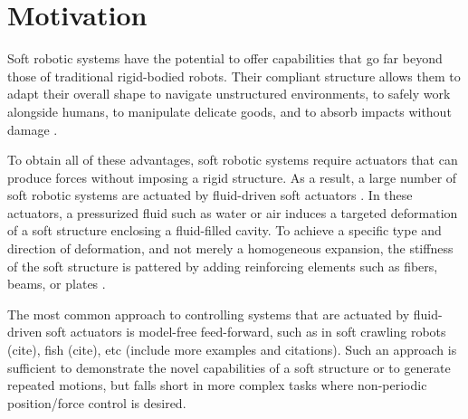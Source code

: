 \section{Motivation}    \label{sec:motivation}


Soft robotic systems have the potential to offer capabilities that go far beyond those of traditional rigid-bodied robots.
Their compliant structure allows them to adapt their overall shape to navigate unstructured environments, to safely work alongside humans, to manipulate delicate goods, and to absorb impacts without damage \cite{majidi2014soft}. 

To obtain all of these advantages, soft robotic systems require actuators that can produce forces without imposing a rigid structure. As a result, a large number of soft robotic systems are actuated by fluid-driven soft actuators \cite{grissom2006design, hawkes2017soft, marchese2014autonomous, tolley2014resilient}. 
In these actuators, a pressurized fluid such as water or air induces a targeted deformation of a soft structure enclosing a fluid-filled cavity. 
To achieve a specific type and direction of deformation, and not merely a homogeneous expansion, the stiffness of the soft structure is pattered by adding reinforcing elements such as fibers, beams, or plates \cite{galloway2013mechanically, marchese2015recipe, rus2015design}.

The most common approach to controlling systems that are actuated by fluid-driven soft actuators is model-free feed-forward, such as in soft crawling robots (cite), fish (cite), etc (include more examples and citations). Such an approach is sufficient to demonstrate the novel capabilities of a soft structure or to generate repeated motions, but falls short in more complex tasks where non-periodic position/force control is desired.  

